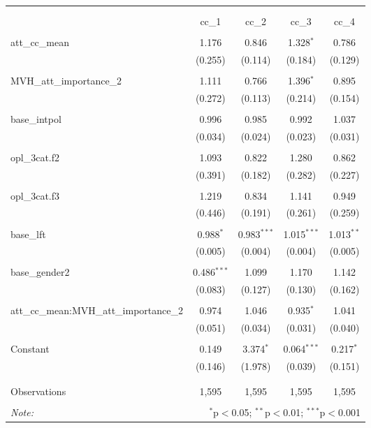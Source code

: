 
\begin{table}[!htbp] \centering 
  \caption{} 
  \label{} 
\begin{tabular}{@{\extracolsep{5pt}}lcccc} 
\\[-1.8ex]\hline 
\hline \\[-1.8ex] 
\\[-1.8ex] & cc\_1 & cc\_2 & cc\_3 & cc\_4 \\ 
\hline \\[-1.8ex] 
 att\_cc\_mean & 1.176 & 0.846 & 1.328$^{*}$ & 0.786 \\ 
  & (0.255) & (0.114) & (0.184) & (0.129) \\ 
  & & & & \\ 
 MVH\_att\_importance\_2 & 1.111 & 0.766 & 1.396$^{*}$ & 0.895 \\ 
  & (0.272) & (0.113) & (0.214) & (0.154) \\ 
  & & & & \\ 
 base\_intpol & 0.996 & 0.985 & 0.992 & 1.037 \\ 
  & (0.034) & (0.024) & (0.023) & (0.031) \\ 
  & & & & \\ 
 opl\_3cat.f2 & 1.093 & 0.822 & 1.280 & 0.862 \\ 
  & (0.391) & (0.182) & (0.282) & (0.227) \\ 
  & & & & \\ 
 opl\_3cat.f3 & 1.219 & 0.834 & 1.141 & 0.949 \\ 
  & (0.446) & (0.191) & (0.261) & (0.259) \\ 
  & & & & \\ 
 base\_lft & 0.988$^{*}$ & 0.983$^{***}$ & 1.015$^{***}$ & 1.013$^{**}$ \\ 
  & (0.005) & (0.004) & (0.004) & (0.005) \\ 
  & & & & \\ 
 base\_gender2 & 0.486$^{***}$ & 1.099 & 1.170 & 1.142 \\ 
  & (0.083) & (0.127) & (0.130) & (0.162) \\ 
  & & & & \\ 
 att\_cc\_mean:MVH\_att\_importance\_2 & 0.974 & 1.046 & 0.935$^{*}$ & 1.041 \\ 
  & (0.051) & (0.034) & (0.031) & (0.040) \\ 
  & & & & \\ 
 Constant & 0.149 & 3.374$^{*}$ & 0.064$^{***}$ & 0.217$^{*}$ \\ 
  & (0.146) & (1.978) & (0.039) & (0.151) \\ 
  & & & & \\ 
\hline \\[-1.8ex] 
Observations & 1,595 & 1,595 & 1,595 & 1,595 \\ 
\hline 
\hline \\[-1.8ex] 
\textit{Note:}  & \multicolumn{4}{r}{$^{*}$p$<$0.05; $^{**}$p$<$0.01; $^{***}$p$<$0.001} \\ 
\end{tabular} 
\end{table} 
